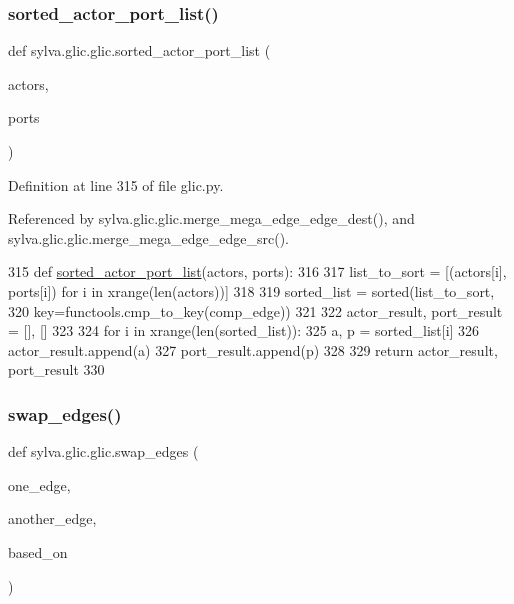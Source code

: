 \subsubsection{\texorpdfstring{sorted\+\_\+actor\+\_\+port\+\_\+list()}{sorted\_actor\_port\_list()}}
{\footnotesize\ttfamily def sylva.\+glic.\+glic.\+sorted\+\_\+actor\+\_\+port\+\_\+list (\begin{DoxyParamCaption}\item[{}]{actors,  }\item[{}]{ports }\end{DoxyParamCaption})}



Definition at line 315 of file glic.\+py.



Referenced by sylva.\+glic.\+glic.\+merge\+\_\+mega\+\_\+edge\+\_\+edge\+\_\+dest(), and sylva.\+glic.\+glic.\+merge\+\_\+mega\+\_\+edge\+\_\+edge\+\_\+src().


\begin{DoxyCode}
315   \textcolor{keyword}{def }\hyperlink{namespacesylva_1_1glic_1_1glic_af9c053311339f7220d8a605b492126c0}{sorted\_actor\_port\_list}(actors, ports):
316 
317     list\_to\_sort = [(actors[i], ports[i]) \textcolor{keywordflow}{for} i \textcolor{keywordflow}{in} xrange(len(actors))]
318 
319     sorted\_list = sorted(list\_to\_sort,
320                          key=functools.cmp\_to\_key(comp\_edge))
321 
322     actor\_result, port\_result = [], []
323 
324     \textcolor{keywordflow}{for} i \textcolor{keywordflow}{in} xrange(len(sorted\_list)):
325       a, p = sorted\_list[i]
326       actor\_result.append(a)
327       port\_result.append(p)
328 
329     \textcolor{keywordflow}{return} actor\_result, port\_result
330 
\end{DoxyCode}
\mbox{\label{namespacesylva_1_1glic_1_1glic_aa33f0fa18db2dc181313352cfdbc0cca}} 
\subsubsection{\texorpdfstring{swap\+\_\+edges()}{swap\_edges()}}
{\footnotesize\ttfamily def sylva.\+glic.\+glic.\+swap\+\_\+edges (\begin{DoxyParamCaption}\item[{}]{one\+\_\+edge,  }\item[{}]{another\+\_\+edge,  }\item[{}]{based\+\_\+on }\end{DoxyParamCaption})}



